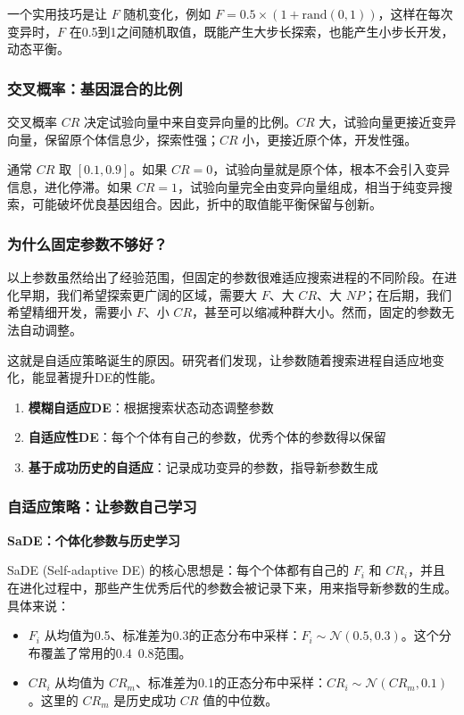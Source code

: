 \documentclass[lang=cn,zihao=-4,a4paper,fontset=windows]{beautybook}
\begin{document}
一个实用技巧是让 $F$ 随机变化，例如 $F = 0.5 \times (1 + \text{rand}(0,1))$，这样在每次变异时，$F$ 在0.5到1之间随机取值，既能产生大步长探索，也能产生小步长开发，动态平衡。

\subsubsection{交叉概率：基因混合的比例}

交叉概率 $CR$ 决定试验向量中来自变异向量的比例。$CR$ 大，试验向量更接近变异向量，保留原个体信息少，探索性强；$CR$ 小，更接近原个体，开发性强。

通常 $CR$ 取 $[0.1, 0.9]$。如果 $CR=0$，试验向量就是原个体，根本不会引入变异信息，进化停滞。如果 $CR=1$，试验向量完全由变异向量组成，相当于纯变异搜索，可能破坏优良基因组合。因此，折中的取值能平衡保留与创新。

\subsubsection{为什么固定参数不够好？}

以上参数虽然给出了经验范围，但固定的参数很难适应搜索进程的不同阶段。在进化早期，我们希望探索更广阔的区域，需要大 $F$、大 $CR$、大 $NP$；在后期，我们希望精细开发，需要小 $F$、小 $CR$，甚至可以缩减种群大小。然而，固定的参数无法自动调整。

这就是自适应策略诞生的原因。研究者们发现，让参数随着搜索进程自适应地变化，能显著提升DE的性能。

\begin{enumerate}
    \item \textbf{模糊自适应DE}：根据搜索状态动态调整参数
    \item \textbf{自适应性DE}：每个个体有自己的参数，优秀个体的参数得以保留
    \item \textbf{基于成功历史的自适应}：记录成功变异的参数，指导新参数生成
\end{enumerate}

\subsubsection{自适应策略：让参数自己学习}

\textbf{SaDE：个体化参数与历史学习}

SaDE (Self-adaptive DE) 的核心思想是：每个个体都有自己的 $F_i$ 和 $CR_i$，并且在进化过程中，那些产生优秀后代的参数会被记录下来，用来指导新参数的生成。具体来说：

\begin{itemize}
    \item $F_i$ 从均值为0.5、标准差为0.3的正态分布中采样：$F_i \sim \mathcal{N}(0.5, 0.3)$。这个分布覆盖了常用的0.4~0.8范围。
    \item $CR_i$ 从均值为 $CR_m$、标准差为0.1的正态分布中采样：$CR_i \sim \mathcal{N}(CR_m, 0.1)$。这里的 $CR_m$ 是历史成功 $CR$ 值的中位数。
\end{itemize}
\end{document}
